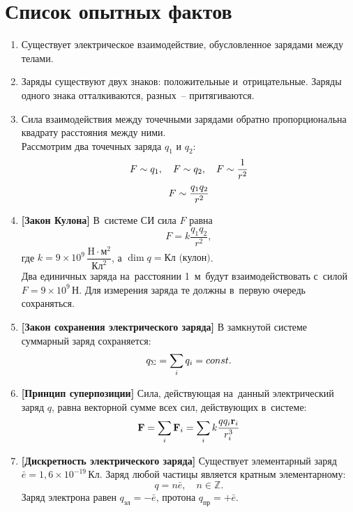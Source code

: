 \section{Список опытных фактов}

\begin{enumerate}
	\item Существует электрическое взаимодействие, обусловленное зарядами между телами.
	\item Заряды существуют двух знаков: положительные и~отрицательные. Заряды одного знака отталкиваются, разных~-- притягиваются.
	\item Сила взаимодействия между точечными зарядами обратно пропорциональна квадрату расстояния между ними. \\
			Рассмотрим два точечных заряда $q_1$ и $q_2$:
				$$F \prop q_1, \quad F \prop q_2, \quad F \prop \frac{1}{r^2}$$
				$$F \prop \frac{q_1q_2}{r^2}$$
	\item \textbf{[Закон Кулона]} В~системе СИ сила $F$ равна
			\begin{equation}\label{1}
				F=k\frac{q_1q_2}{r^2},
			\end{equation}
			где $k=9 \times 10^9 \,\dfrac{\text{H}\cdot \text{м}^2}{\text{Кл}^2}$, а $\dim{q}=\text{Кл (кулон)}$. \\
			Два единичных заряда на~расстоянии 1~м~будут взаимодействовать с~силой $F=9\times 10^9 \, \text{Н}$. Для измерения заряда те должны в~первую очередь сохраняться.
	\item \textbf{[Закон сохранения электрического заряда]} В замкнутой системе суммарный заряд сохраняется:
				$$q_{\Sigma}=\sum_i q_i=\c.$$
	\item \textbf{[Принцип суперпозиции]} Сила, действующая на~данный электрический заряд $q$, равна векторной сумме всех сил, действующих в~системе:
			\begin{equation}\label{2}
				\vec{F} = \sum_i \vec{F}_i = \sum_i k\frac{qq_i\vec{r}_i}{r_i^3} \\
			\end{equation} 
	\item \textbf{[Дискретность электрического заряда]} Существует элементарный заряд $\bar{e}=1,6 \times 10^{-19} \, \text{Кл}$. Заряд любой частицы является кратным элементарному:
				$$q=n\bar{e}, \quad n \in \mathbb{Z}.$$
				Заряд электрона равен $q_{\text{эл}}=-\bar{e}$, протона $q_{\text{пр}}=+\bar{e}$.

\end{enumerate}